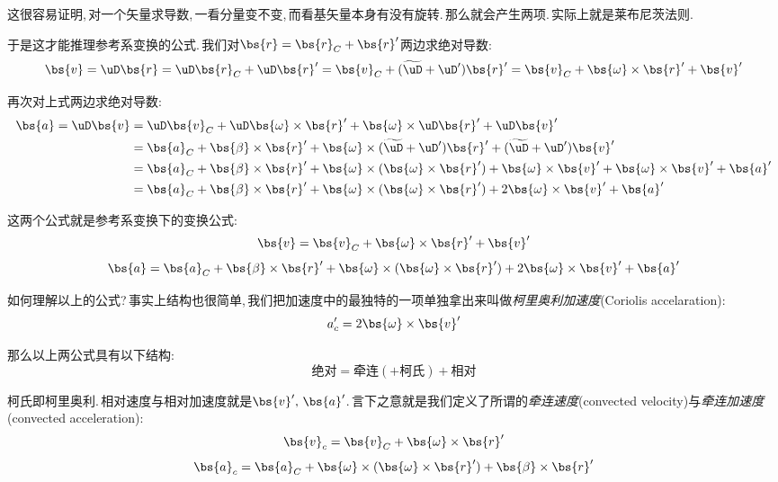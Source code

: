 这很容易证明,\,对一个矢量求导数,\,一看分量变不变,\,而看基矢量本身有没有旋转.\,那么就会产生两项.\,实际上就是莱布尼茨法则.

于是这才能推理参考系变换的公式.\,我们对$\bs{r}=\bs{r}_C+\bs{r}'$两边求绝对导数:
\[\bs{v}=\uD\bs{r}=\uD\bs{r}_C+\uD\bs{r}'=\bs{v}_C+(\widetilde{\uD}+\uD')\bs{r}'=\bs{v}_C+\bs{\omega}\times\bs{r}'+\bs{v}'\]

再次对上式两边求绝对导数:
\begin{align*}
\bs{a}=\uD\bs{v} &=\uD\bs{v}_C+\uD\bs{\omega}\times\bs{r}'+\bs{\omega}\times\uD\bs{r}'+\uD\bs{v}'\\
	  			 &=\bs{a}_C+\bs{\beta}\times\bs{r}'+\bs{\omega}\times(\widetilde{\uD}+\uD')\bs{r}'+(\widetilde{\uD}+\uD')\bs{v}'\\
	  			 &=\bs{a}_C+\bs{\beta}\times\bs{r}'+\bs{\omega}\times(\bs{\omega}\times\bs{r}')+\bs{\omega}\times\bs{v}'+\bs{\omega}\times\bs{v}'+\bs{a}'\\
	  			 &=\bs{a}_C+\bs{\beta}\times\bs{r}'+\bs{\omega}\times(\bs{\omega}\times\bs{r}')+2\bs{\omega}\times\bs{v}'+\bs{a}'
\end{align*}

这两个公式就是参考系变换下的变换公式:
\[\bs{v}=\bs{v}_C+\bs{\omega}\times\bs{r}'+\bs{v}'\]
\[\bs{a}=\bs{a}_C+\bs{\beta}\times\bs{r}'+\bs{\omega}\times(\bs{\omega}\times\bs{r}')+2\bs{\omega}\times\bs{v}'+\bs{a}'\]

如何理解以上的公式?\,事实上结构也很简单,\,我们把加速度中的最独特的一项单独拿出来叫做\emph{柯里奥利加速度}(Coriolis accelaration):
\[a_c'=2\bs{\omega}\times\bs{v}'\]

那么以上两公式具有以下结构:
\[\text{绝对}=\text{牵连}(+\text{柯氏})+\text{相对}\]

柯氏即柯里奥利.\,相对速度与相对加速度就是$\bs{v}',\,\bs{a}'$.\,言下之意就是我们定义了所谓的\emph{牵连速度}(convected velocity)与\emph{牵连加速度}(convected acceleration):
\[\bs{v}_c=\bs{v}_C+\bs{\omega}\times \bs{r}'\]
\[\bs{a}_c=\bs{a}_C+\bs{\omega}\times (\bs{\omega}\times\bs{r}')+\bs{\beta}\times\bs{r}'\]

